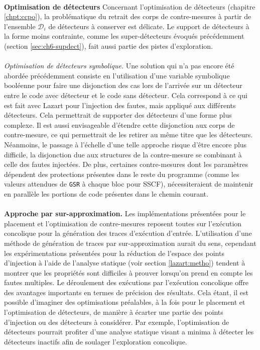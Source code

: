     \paragraph{}
    \textbf{Optimisation de détecteurs}
    Concernant l'optimisation de détecteurs (chapitre \ref{chpt:ccpo}), la problématique du retrait des corps de contre-mesures à partir de l'ensemble $\mathcal{D}_i$ de détecteurs à conserver est délicate.
    Le support de détecteurs à la forme moins contrainte, comme les super-détecteurs évoqués précédemment (section \ref{sec:ch6-supdect}), fait aussi partie des pistes d'exploration.

    \paragraph{}
    \textit{Optimisation de détecteurs symbolique.}
    Une solution qui n'a pas encore été abordée précédemment consiste en l'utilisation d'une variable symbolique booléenne pour faire une disjonction des cas lors de l'arrivée sur un détecteur entre le code avec détecteur et le code sans détecteur.
    Cela correspond à ce qui est fait avec Lazart pour l'injection des fautes, mais appliqué aux différents détecteurs. Cela permettrait de supporter des détecteurs d'une forme plus complexe.
    Il est aussi envisageable d'étendre cette disjonction aux corps de contre-mesure, ce qui permettrait de les retirer au même titre que les détecteurs.     
    Néanmoins, le passage à l'échelle d'une telle approche risque d'être encore plus difficile, la disjonction due aux structures de la contre-mesure se combinant à celle des fautes injectées.
    De plus, certaines contre-mesures dont les paramètres dépendent des protections présentes dans le reste du programme (comme les valeurs attendues de \texttt{GSR} à chaque bloc pour SSCF), nécessiteraient de maintenir en parallèle les portions de code présentes dans le chemin courant.

    \paragraph{}
    \textbf{Approche par sur-approximation.}
    Les implémentations présentées pour le placement et l'optimisation de contre-mesures reposent toutes sur l'exécution concolique pour la génération des traces d'exécution d'entrée.
    L'utilisation d'une méthode de génération de traces par sur-approximation aurait du sens, cependant les expérimentations présentées pour la réduction de l'espace des points d'injection à l'aide de l'analyse statique (voir section \ref{lazart:metho}) tendent à montrer que les propriétés sont difficiles à prouver lorsqu'on prend en compte les fautes multiples. 
    Le \og déroulement \fg{} des exécutions par l'exécution concolique offre des avantages importants en termes de précision des résultats.
    Cela étant, il est possible d'imaginer des optimisations préalables, à la fois pour le placement et l'optimisation de détecteurs, de manière à écarter une partie des points d'injection ou des détecteurs à considérer.
    Par exemple, l'optimisation de détecteurs pourrait profiter d'une analyse statique visant a minima à détecter les détecteurs inactifs afin de soulager l'exploration concolique.

